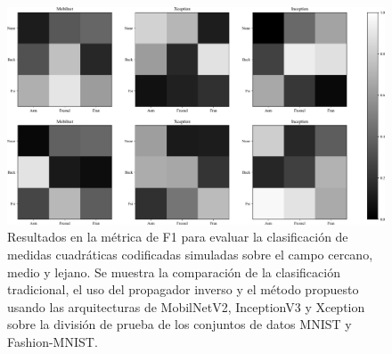 \begin{figure}[!h]
    \centering
    \includegraphics[width=\linewidth]{images/test_result_f1_score.pdf}
    \caption{Resultados en la métrica de F1 para evaluar la clasificación de medidas cuadráticas codificadas simuladas sobre el campo cercano, medio y lejano. Se muestra la comparación de la clasificación tradicional, el uso del propagador inverso y el método propuesto usando las arquitecturas de MobilNetV2, InceptionV3 y Xception sobre la división de prueba de los conjuntos de datos MNIST y Fashion-MNIST.}
    \label{fig:results_f1}
\end{figure}